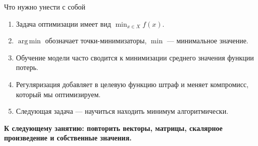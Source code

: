 \documentclass[aspectratio=169,10pt]{beamer}
\newcommand{\argmin}{\operatorname*{arg\,min}}
\begin{document}
\begin{frame}{Что нужно унести с собой}
\begin{enumerate}
  \item Задача оптимизации имеет вид $\min_{x\in X}f(x)$.
  \item $\argmin$ обозначает точки-минимизаторы, $\min$ --- минимальное значение.
  \item Обучение модели часто сводится к минимизации среднего значения функции потерь.
  \item Регуляризация добавляет в целевую функцию штраф и меняет компромисс, который мы оптимизируем.
  \item Следующая задача --- научиться находить минимум алгоритмически.
\end{enumerate}
\vfill
\centering
\textbf{К следующему занятию: повторить векторы, матрицы, скалярное произведение и собственные значения.}
\end{frame}
\end{document}
